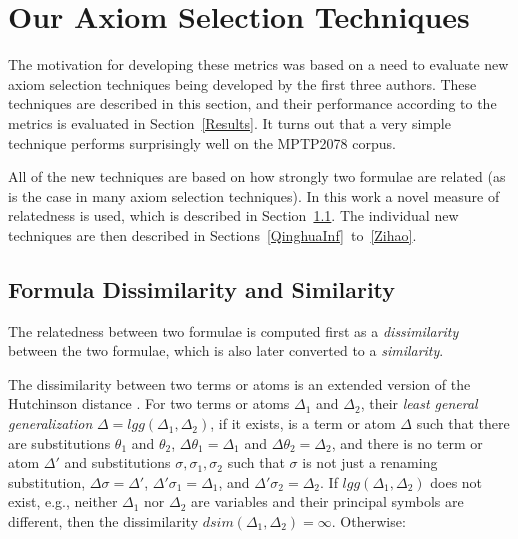 \documentclass[]{ceurart}
\begin{document}
\section{Our Axiom Selection Techniques}
\label{Ours}

The motivation for developing these metrics was based on a need to evaluate
new axiom selection techniques being developed by the first three authors.
These techniques are described in this section, and their performance
according to the metrics is evaluated in Section~\ref{Results}.
It turns out that a very simple technique performs surprisingly well
on the MPTP2078 corpus.

All of the new techniques are based on how strongly two formulae are
related (as is the case in many axiom selection techniques).
In this work a novel measure of relatedness is used, which is described
in Section~\ref{QinghuaDistance}.
The individual new techniques are then described in 
Sections~\ref{QinghuaInf}~to~\ref{Zihao}.

\subsection{Formula Dissimilarity and Similarity}
\label{QinghuaDistance}

The relatedness between two formulae is computed first as a
\emph{dissimilarity} between the two formulae, which is also later converted
to a \emph{similarity}.

The dissimilarity between two terms or atoms is an extended version of the
Hutchinson distance \cite{Hut97}.
For two terms or atoms $\Delta_1$ and $\Delta_2$, their \emph{least general 
generalization} $\Delta = lgg(\Delta_1,\Delta_2)$, if it exists, is a term 
or atom $\Delta$ such that there are substitutions $\theta_1$ and $\theta_2$, 
$\Delta\theta_1 = \Delta_1$ and $\Delta\theta_2 = \Delta_2$, and 
there is no term or atom $\Delta'$ and substitutions 
$\sigma, \sigma_1, \sigma_2$ such that 
$\sigma$ is not just a renaming substitution,
$\Delta\sigma = \Delta'$, $\Delta'\sigma_1 = \Delta_1$, 
and $\Delta'\sigma_2 = \Delta_2$.
If $lgg(\Delta_1,\Delta_2)$ does not exist, e.g., neither $\Delta_1$ nor
$\Delta_2$ are variables and their principal symbols are different, then the 
dissimilarity $dsim(\Delta_1,\Delta_2) = \infty$.
Otherwise:
\end{document}
